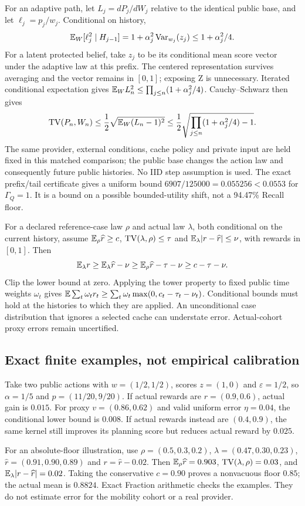 For an adaptive path, let $L_j=dP_j/dW_j$ relative to the identical public
base, and let $\ell_j=p_j/w_j$. Conditional on history,
\[
\mathbb E_W[\ell_j^2\mid H_{j-1}]
=1+\alpha_j^2\operatorname{Var}_{w_j}(z_j)\le1+\alpha_j^2/4 .
\]
For a latent protected belief, take $z_j$ to be its conditional mean score
vector under the adaptive law at this prefix. The centered representation
survives averaging and the vector remains in $[0,1]$; exposing Z is unnecessary.
Iterated conditional expectation gives
$\mathbb E_WL_n^2\le\prod_{j\le n}(1+\alpha_j^2/4)$.
Cauchy--Schwarz then gives
\[
\operatorname{TV}(P_n,W_n)\le\frac12\sqrt{\mathbb E_W(L_n-1)^2}
\le\frac12\sqrt{\prod_{j\le n}(1+\alpha_j^2/4)-1}.
\]
The same provider, external conditions, cache policy and private input are
held fixed in this matched comparison; the public base changes the action
law and consequently future public histories. No IID step assumption is used.
The exact prefix/tail certificate gives a uniform bound
$6907/125000=0.055256<0.0553$ for $\Gamma_Q=1$.
It is a bound on a possible bounded-utility shift, not a 94.47\% Recall floor.

For a declared reference-case law $\rho$ and actual law $\lambda$, both
conditional on the current history, assume $\mathbb E_\rho\widehat r\ge c$,
$\operatorname{TV}(\lambda,\rho)\le\tau$ and
$\mathbb E_\lambda|r-\widehat r|\le\nu$, with rewards in $[0,1]$. Then
\[
\mathbb E_\lambda r\ge\mathbb E_\lambda\widehat r-\nu
\ge\mathbb E_\rho\widehat r-\tau-\nu\ge c-\tau-\nu .
\]
Clip the lower bound at zero. Applying the tower property to fixed public
time weights $\omega_t$ gives
$\mathbb E\sum_t\omega_t r_t\ge\sum_t\omega_t\max(0,c_t-\tau_t-\nu_t)$.
Conditional bounds must hold at the histories to which they are applied.
An unconditional case distribution that ignores a selected cache can
understate error. Actual-cohort proxy errors remain uncertified.

\subsection{Exact finite examples, not empirical calibration}
Take two public actions with $w=(1/2,1/2)$, scores $z=(1,0)$ and
$\varepsilon=1/2$, so $\alpha=1/5$ and $p=(11/20,9/20)$.
If actual rewards are $r=(0.9,0.6)$, actual gain is $0.015$.
For proxy $v=(0.86,0.62)$ and valid uniform error $\eta=0.04$,
the conditional lower bound is $0.008$.
If actual rewards instead are $(0.4,0.9)$, the same kernel still improves
its planning score but reduces actual reward by $0.025$.

For an absolute-floor illustration, use
$\rho=(0.5,0.3,0.2)$, $\lambda=(0.47,0.30,0.23)$,
$\widehat r=(0.91,0.90,0.89)$ and $r=\widehat r-0.02$.
Then $\mathbb E_\rho\widehat r=0.903$, $\operatorname{TV}(\lambda,\rho)=0.03$,
and $\mathbb E_\lambda|r-\widehat r|=0.02$.
Taking the conservative $c=0.90$ proves a nonvacuous floor $0.85$;
the actual mean is $0.8824$. Exact Fraction arithmetic checks the examples.
They do not estimate error for the mobility cohort or a real provider.


